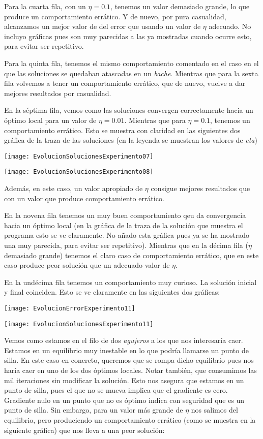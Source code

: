 \documentclass[11pt]{article}
\begin{document}
Para la cuarta fila, con un $\eta = 0.1$, tenemos un valor demasiado grande, lo que produce un comportamiento errático. Y de nuevo, por pura casualidad, alcanzamos un mejor valor de del error que usando un valor de $\eta$ adecuado. No incluyo gráficas pues son muy parecidas a las ya mostradas cuando ocurre esto, para evitar ser repetitivo.

Para la quinta fila, tenemos el mismo comportamiento comentado en el caso en el que las soluciones se quedaban atascadas en un \emph{bache}. Mientras que para la sexta fila volvemos a tener un comportamiento errático, que de nuevo, vuelve a dar mejores resultados por casualidad.

En la séptima fila, vemos como las soluciones convergen correctamente hacia un óptimo local para un valor de $\eta = 0.01$. Mientras que para $\eta = 0.1$, tenemos un comportamiento errático. Esto se muestra con claridad en las siguientes dos gráfica de la traza de las soluciones (en la leyenda se muestran los valores de \emph{eta})

\texttt{[image: EvolucionSolucionesExperimento07]}

\texttt{[image: EvolucionSolucionesExperimento08]}

Además, en este caso, un valor apropiado de $\eta$ consigue mejores resultados que con un valor que produce comportamiento errático.

En la novena fila tenemos un muy buen comportamiento qeu da convergencia hacia un óptimo local (en la gráfica de la traza de la solución que muestra el programa esto se ve claramente. No añado esta gráfica pues ya se ha mostrado una muy parecida, para evitar ser repetitivo). Mientras que en la décima fila ($\eta$ demasiado grande) tenemos el claro caso de comportamiento errático, que en este caso produce peor solución que un adecuado valor de $\eta$.

En la undécima fila tenemos un comportamiento muy curioso. La solución inicial y final coinciden. Esto se ve claramente en las siguientes dos gráficas:

\texttt{[image: EvolucionErrorExperimento11]}

\texttt{[image: EvolucionSolucionesExperimento11]}

Vemos como estamos en el filo de dos \emph{agujeros} a los que nos interesaría caer. Estamos en un equilibrio muy inestable en lo que podría llamarse un punto de silla. En este caso en concreto, queremos que se rompa dicho equilibrio pues nos haría caer en uno de los dos óptimos locales. Notar también, que consumimos las mil iteraciones sin modificar la solución. Esto nos asegura que estamos en un punto de silla, pues el que no se mueva implica que el gradiente es cero. Gradiente nulo en un punto que no es óptimo indica con seguridad que es un punto de silla. Sin embargo, para un valor más grande de $\eta$ nos salimos del equilibrio, pero produciendo un comportamiento errático (como se muestra en la siguiente gráfica) que nos lleva a una peor solución:
\end{document}
